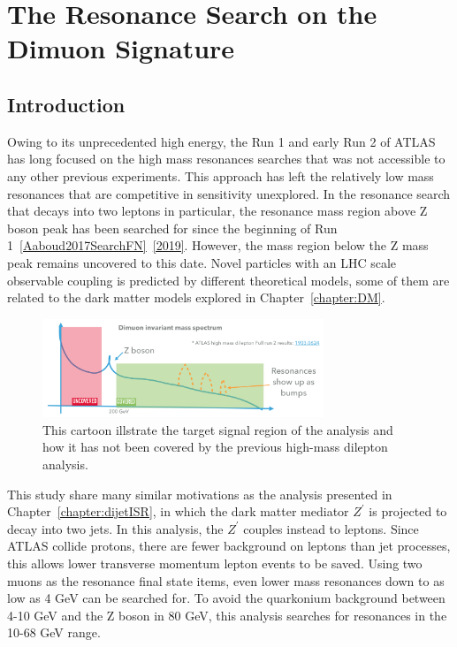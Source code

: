 \chapter{The Resonance Search on the Dimuon Signature}
\label{chapter:dimuon}

\section{Introduction}

Owing to its unprecedented high energy, the Run 1 and early Run 2 of ATLAS has long focused on the high mass resonances searches that was not accessible to any other previous experiments. This approach has left the relatively low mass resonances that are competitive in sensitivity unexplored. In the resonance search that decays into two leptons in particular, the resonance mass region above Z boson peak has been searched for since the beginning of Run
1~\ref{Aaboud2017SearchFN}~\ref{2019}. However, the mass region below the Z mass peak remains uncovered to this date. Novel particles with an LHC scale observable coupling is predicted by different theoretical models, some of them are related to the dark matter models explored in Chapter~\ref{chapter:DM}.

\begin{figure}[!htb]
    \begin{center}
        \includegraphics[width=0.75\textwidth]{figures/chapter_dimuon/dimuonStudies}        
        \caption{
        This cartoon illstrate the target signal region of the analysis and how it has not been covered by the previous high-mass dilepton analysis. }
            \label{fig:dimuonstudies}
    \end{center}
\end{figure}
\FloatBarrier
   
This study share many similar motivations as the analysis presented in Chapter~\ref{chapter:dijetISR}, in which the dark matter mediator $Z^\prime$ is projected to decay into two jets. In this analysis, the $Z^\prime$ couples instead to leptons. Since ATLAS collide protons, there are fewer background on leptons than jet processes, this allows lower transverse momentum lepton events to be saved. Using two muons as the resonance final state items, even lower mass resonances
down to as low as 4 GeV can be searched for. To avoid the quarkonium background between 4-10 GeV and the Z boson in 80 GeV, this analysis searches for resonances in the 10-68 GeV range.

